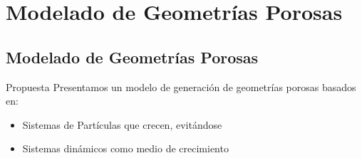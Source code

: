 \documentclass[spanish]{beamer}
\begin{document}
\section{Modelado de Geometrías Porosas}
\subsection{Modelado de Geometrías Porosas}
\begin{frame}{Propuesta}
Presentamos un modelo de generación de geometrías porosas basados en:
\begin{itemize}
\item Sistemas de Partículas que crecen, evitándose
\item Sistemas dinámicos como medio de crecimiento
\end{itemize}
\end{frame}
\end{document}
